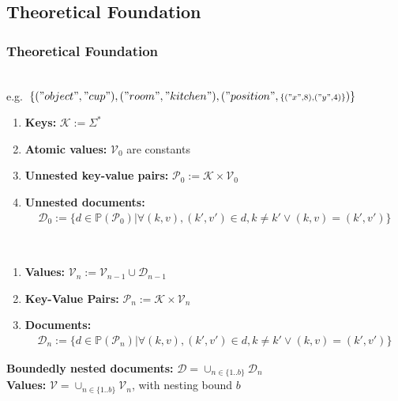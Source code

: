 \subsection{Theoretical Foundation}
\begin{frame}
  \frametitle{Theoretical Foundation}
\begin{description}[]
  \item[Definition of documents representing knowledge] \hfill \\
  \small e.g.~$\{("object","cup"),("room","kitchen"),("position",{\scriptstyle\{("x",8),("y",4)\}})\}$
  \begin{enumerate}
\item \textbf{Keys:} $\mathcal{K} := \Sigma^*$
\item  \textbf{Atomic values:} $\mathcal{V}_0$ are constants
\item \textbf{Unnested key-value pairs:} $\mathcal{P}_0:=\mathcal{K}\times\mathcal{V}_0$
\item \textbf{Unnested documents:} \vspace{-0.3cm}
\begin{align*}
\mathcal{D}_0:=\{
  d\in\mathbb{P}(\mathcal{P}_0)|
  \forall (k,v),(k',v')\in d , k\neq k' \vee (k,v)=(k',v')
  \}
\end{align*}
\end{enumerate}
  \item[With nesting] \hfill \\
  \begin{enumerate}
\item  \textbf{Values:} $\mathcal{V}_n := \mathcal{V}_{n-1} \cup \mathcal{D}_{n-1}$
\item \textbf{Key-Value Pairs:} $\mathcal{P}_n:=\mathcal{K}\times\mathcal{V}_n$
\item \textbf{Documents:} \vspace{-0.3cm}
\begin{align*}
  \mathcal{D}_n:=\{
  d\in\mathbb{P}(\mathcal{P}_n)|
  \forall (k,v),(k',v')\in d , k\neq k' \vee (k,v)=(k',v')
  \}
\end{align*}
\end{enumerate}
  \end{description}
  \textbf{Boundedly nested documents:} $\mathcal{D}=\cup_{n\in\{1..b\}}\mathcal{D}_n$\\
  \textbf{Values:} $\mathcal{V}=\cup_{n\in\{1..b\}}\mathcal{V}_n$, with nesting bound $b$
\end{frame}

